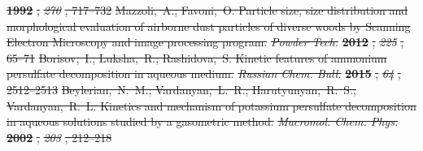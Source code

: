 \documentclass[journal=langd5,manuscript=article]{achemso}
\providecommand{\DIFdel}[1]{{\protect\color{red}\sout{#1}}}                      %
\providecommand{\DIFaddbegin}{} %
\providecommand{\DIFaddend}{} %
\providecommand{\DIFdelend}{} %
\begin{document}
\textbf{\DIFdel{1992}}%
\DIFdel{, }\emph{\DIFdel{270}}%
\DIFdel{,
  717--732}%
\DIFdel{Mazzoli,~A.; Favoni,~O. Particle size, size distribution and morphological
  evaluation of airborne dust particles of diverse woods by Scanning Electron
  Microscopy and image processing program. }\emph{\DIFdel{Powder Tech.}} %
\textbf{\DIFdel{2012}}%
\DIFdel{,
  }\emph{\DIFdel{225}}%
\DIFdel{, 65--71}%
\DIFdel{Borisov,~I.; Luksha,~R.; Rashidova,~S. Kinetic features of ammonium persulfate
  decomposition in aqueous medium. }\emph{\DIFdel{Russian Chem. Bull.}} %
\textbf{\DIFdel{2015}}%
\DIFdel{,
  }\emph{\DIFdel{64}}%
\DIFdel{, 2512--2513}%
\DIFdel{Beylerian,~N.~M.; Vardanyan,~L.~R.; Harutyunyan,~R.~S.; Vardanyan,~R.~L.
  Kinetics and mechanism of potassium persulfate decomposition in aqueous
  solutions studied by a gasometric method. }\emph{\DIFdel{Macromol. Chem. Phys.}}
\textbf{\DIFdel{2002}}%
\DIFdel{, }\emph{\DIFdel{203}}%
\DIFdel{, 212--218}%
\DIFdelend \DIFaddbegin 
\DIFaddend 
\end{document}
